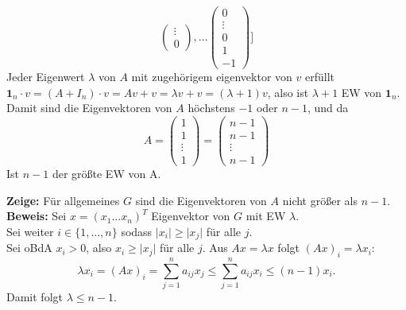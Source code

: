 \begin{problem*}[3]
\begin{equation*}
\begin{pmatrix}
   \vdots\\
   0
   \end{pmatrix}, \dots
   \begin{pmatrix}
   0 \\
   \vdots \\
   0 \\
   1\\
   -1
   \end{pmatrix}   
]
 \end{equation*} 
 Jeder Eigenwert $ \lambda $ von $ A $ mit zugehörigem eigenvektor von $ v $ erfüllt\\
 $\textbf{1}_n \cdot v = (A + I_n) \cdot v = Av + v = \lambda v + v = (\lambda + 1)v$, also ist $ \lambda +1 $ EW von $\textbf{1}_n$. \\
 Damit sind die Eigenvektoren von $ A $ höchstens $ -1 $ oder $ n-1 $, und da 
 \begin{equation*}
   A = \begin{pmatrix}
   1 \\
   1 \\
   \vdots \\
   1
     
   \end{pmatrix} = 
   \begin{pmatrix}
   n-1 \\
   n-1 \\
   \vdots \\
   n-1
     
   \end{pmatrix}
 \end{equation*}
 Ist $ n-1 $ der größte EW von A.
\end{problem*}

\begin{problem*}[3b]
\textbf{Zeige:} Für allgemeines $ G $ sind die Eigenvektoren von $ A $ nicht größer als $ n-1 $. \\
\textbf{Beweis:} Sei $ x = (x_1 \dots x_n)^{ T }$ Eigenvektor von $ G $ mit EW $ \lambda $.\\
Sei weiter $i \in \{ 1, \dots, n \} $ sodass $ \vert x_i \vert \geq \vert x_j \vert$ für alle $ j $.\\
Sei oBdA $ x_i > 0 $, also $ x_i \geq \vert x_j \vert$ für alle $ j $.
Aus $ Ax = \lambda x$ folgt $ (Ax)_i = \lambda x_i$:
\begin{equation*}
  \lambda x_i = (Ax)_i = \sum_{ j=1 }^{ n } a_{ ij }x_j \leq \sum_{ j=1 }^{ n } a_{ ij }x_i \leq (n-1)x_i.
\end{equation*}
Damit folgt $ \lambda \leq n-1 $.
\end{problem*}

